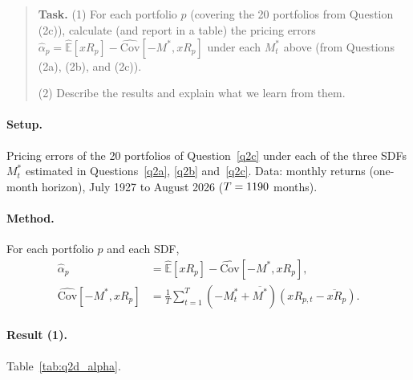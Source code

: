 \documentclass[11pt]{article}
\newcommand{\task}[1]{\begin{quote}\small\textbf{Task.} #1\end{quote}}
\begin{document}
\FloatBarrier
\subsection{}\label{q2d}
\task{(1) For each portfolio $p$ (covering the 20 portfolios from Question (2c)), calculate (and report in a table) the pricing errors $\hat{\alpha}_p = \widehat{\mathbb{E}}[xR_p] - \widehat{\mathrm{Cov}}[-M^*, xR_p]$ under each $M^*_t$ above (from Questions (2a), (2b), and (2c)).\par (2) Describe the results and explain what we learn from them.}
\paragraph{Setup.}
Pricing errors of the 20 portfolios of Question~\ref{q2c} under each of the three SDFs $M^*_t$ estimated in
Questions~\ref{q2a}, \ref{q2b} and~\ref{q2c}. Data: monthly returns (one-month horizon), July 1927 to
August 2026 ($T = \QtwocT$ months).

\paragraph{Method.}
For each portfolio $p$ and each SDF,
\begin{align*}
  \hat{\alpha}_p &= \widehat{\mathbb{E}}[xR_p] - \widehat{\mathrm{Cov}}[-M^*, xR_p], \\
  \widehat{\mathrm{Cov}}[-M^*, xR_p] &= \frac{1}{T}\sum_{t=1}^{T} (-M^*_t + \overline{M^*})(xR_{p,t} - \overline{xR}_p).
\end{align*}

\paragraph{Result (1).}
Table~\ref{tab:q2d_alpha}.

\begin{table}[htbp]
  \centering
  
  \caption{Pricing errors
    $\hat{\alpha}_p = \widehat{\mathbb{E}}[xR_p] - \widehat{\mathrm{Cov}}[-M^*, xR_p]$ of the
    20 book-to-market and momentum decile portfolios under the SDFs $M^*_t$ estimated in
    Question~\ref{q2a} (10 book-to-market deciles), Question~\ref{q2b} (10 momentum deciles) and
    Question~\ref{q2c} (all 20 portfolios). Sample: July 1927 to August 2026 ($T = \QtwocT$ months). Data:
    monthly value-weighted returns (one-month horizon) in excess of the Fama--French risk-free rate. Units:
    percent per month. Covariances divide by $T$. No standard errors are reported.}
  \label{tab:q2d_alpha}
\end{table}
\end{document}
